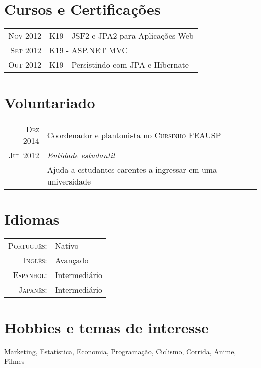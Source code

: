 \documentclass[a4paper,10pt]{article}
\begin{document}
\section{Cursos e Certificações}
\begin{tabular}{rl}
 \textsc{Nov} 2012 & K19 - JSF2 e JPA2 para Aplicações Web\\
\textsc{Set} 2012 & K19 - ASP.NET MVC\\
\textsc{Out} 2012 & K19 - Persistindo com JPA e Hibernate\\
\end{tabular}

\section{Voluntariado}
\begin{tabular}{r|p{11cm}}
  \textsc{Dez} 2014 & Coordenador e plantonista no \textsc{Cursinho FEAUSP} \\\textsc{Jul 2012}&\emph{Entidade estudantil}\\&\footnotesize{
 Ajuda a estudantes carentes a ingressar em uma universidade}

\end{tabular}

\section{Idiomas}
\begin{tabular}{rl}
 \textsc{Português:}&Nativo\\
\textsc{Inglês:}&Avançado\\
\textsc{Espanhol:}&Intermediário\\
\textsc{Japanês:}&Intermediário\\
\end{tabular}

\section{Hobbies e temas de interesse}
Marketing, Estatística, Economia, Programação, Ciclismo, Corrida, Anime, Filmes\\

\newpage

\end{document}
